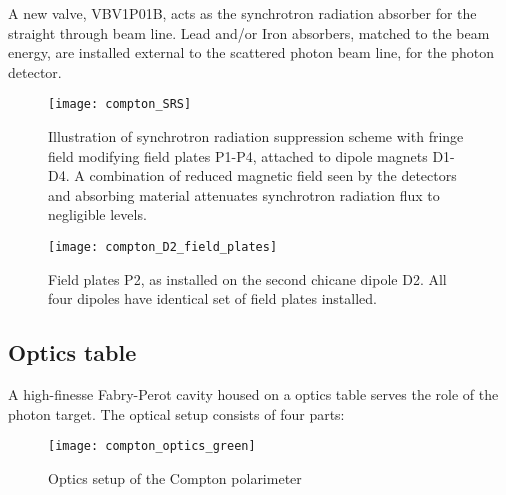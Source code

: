 A new valve, VBV1P01B, acts as the synchrotron radiation absorber for the straight through beam line. Lead and/or Iron absorbers, matched to the beam energy, are installed external to the scattered photon beam line, for the photon detector.
\begin{figure}[htp]
    \begin{center}
        \texttt{[image: compton\_SRS]}
    \end{center}
\caption{ Illustration of synchrotron radiation suppression scheme with fringe field modifying field plates P1-P4, attached to dipole magnets D1-D4. A combination of reduced magnetic field seen by the  detectors and absorbing material attenuates synchrotron radiation flux to negligible  levels. }
    \label{fig:compton_SRS}
 \end{figure}


\begin{figure}[htp]
    \begin{center}
        \texttt{[image: compton\_D2\_field\_plates]}
    \end{center}
    \caption[compton:Field plates]{
            Field plates P2, as  installed on the second chicane dipole D2.  All four dipoles have identical set of field plates installed.}
    \label{fig:compton_field_plates}
 \end{figure}

\subsection{Optics table}
\label{sec:compton_optics}
A high-finesse Fabry-Perot cavity housed on a optics table serves the role of the photon target.
The optical setup consists of four parts:
\begin{figure}[htp]
    \begin{center}
        \texttt{[image: compton\_optics\_green]}
    \end{center}
    \caption[compton:Optics Table]{
            Optics setup  of the  Compton polarimeter
            }
    \label{fig:compton_optics}
 \end{figure}

